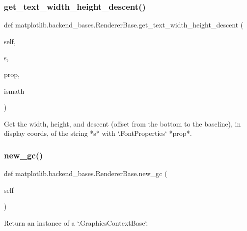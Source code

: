 \subsubsection{\texorpdfstring{get\+\_\+text\+\_\+width\+\_\+height\+\_\+descent()}{get\_text\_width\_height\_descent()}}
{\footnotesize\ttfamily def matplotlib.\+backend\+\_\+bases.\+Renderer\+Base.\+get\+\_\+text\+\_\+width\+\_\+height\+\_\+descent (\begin{DoxyParamCaption}\item[{}]{self,  }\item[{}]{s,  }\item[{}]{prop,  }\item[{}]{ismath }\end{DoxyParamCaption})}

\begin{DoxyVerb}Get the width, height, and descent (offset from the bottom
to the baseline), in display coords, of the string *s* with
`.FontProperties` *prop*.
\end{DoxyVerb}
 \mbox{\label{classmatplotlib_1_1backend__bases_1_1RendererBase_aa36cdf81b9dbd92f2b98467a2aadaed9}} 
\subsubsection{\texorpdfstring{new\+\_\+gc()}{new\_gc()}}
{\footnotesize\ttfamily def matplotlib.\+backend\+\_\+bases.\+Renderer\+Base.\+new\+\_\+gc (\begin{DoxyParamCaption}\item[{}]{self }\end{DoxyParamCaption})}

\begin{DoxyVerb}Return an instance of a `.GraphicsContextBase`.\end{DoxyVerb}
 \mbox{\label{classmatplotlib_1_1backend__bases_1_1RendererBase_a5a4ba575315b880703e939d32d9fa87a}} 
